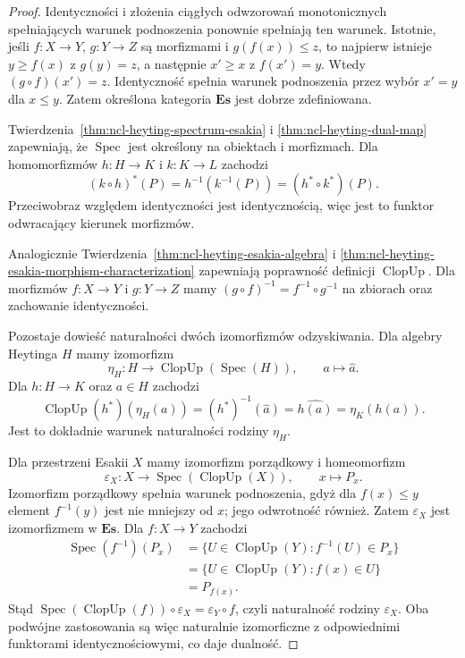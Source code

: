 \begin{proof}
Identyczności i złożenia ciągłych odwzorowań
monotonicznych spełniających warunek podnoszenia
ponownie spełniają ten warunek.
Istotnie, jeśli $f:X\to Y$, $g:Y\to Z$ są
morfizmami i $g(f(x))\leq z$, to najpierw
istnieje $y\geq f(x)$ z $g(y)=z$,
a następnie $x'\geq x$ z $f(x')=y$.
Wtedy $(g\circ f)(x')=z$.
Identyczność spełnia warunek podnoszenia
przez wybór $x'=y$ dla $x\leq y$.
Zatem określona kategoria $\mathbf{Es}$ jest
dobrze zdefiniowana.

Twierdzenia~\ref{thm:ncl-heyting-spectrum-esakia}
i \ref{thm:ncl-heyting-dual-map} zapewniają,
że $\operatorname{Spec}$ jest określony
na obiektach i morfizmach. Dla homomorfizmów
$h:H\to K$ i $k:K\to L$ zachodzi
\[
 (k\circ h)^*(P)=h^{-1}(k^{-1}(P))
                 =(h^*\circ k^*)(P).
\]
Przeciwobraz względem identyczności jest
identycznością, więc jest to funktor
odwracający kierunek morfizmów.

Analogicznie
Twierdzenia~\ref{thm:ncl-heyting-esakia-algebra}
i \ref{thm:ncl-heyting-esakia-morphism-characterization}
zapewniają poprawność definicji
$\operatorname{ClopUp}$. Dla morfizmów
$f:X\to Y$ i $g:Y\to Z$ mamy
$(g\circ f)^{-1}=f^{-1}\circ g^{-1}$
na zbiorach oraz zachowanie identyczności.

Pozostaje dowieść naturalności dwóch izomorfizmów
odzyskiwania. Dla algebry Heytinga $H$ mamy
izomorfizm
\[
 \eta_H:H\to\operatorname{ClopUp}(\operatorname{Spec}(H)),
 \qquad a\mapsto\widehat a.
\]
Dla $h:H\to K$ oraz $a\in H$ zachodzi
\[
 \operatorname{ClopUp}(h^*)(\eta_H(a))
   =(h^*)^{-1}(\widehat a)
   =\widehat{h(a)}
   =\eta_K(h(a)).
\]
Jest to dokładnie warunek naturalności rodziny
$\eta_H$.

Dla przestrzeni Esakii $X$ mamy izomorfizm
porządkowy i homeomorfizm
\[
 \varepsilon_X:X\to\operatorname{Spec}(\operatorname{ClopUp}(X)),
 \qquad x\mapsto P_x.
\]
Izomorfizm porządkowy spełnia warunek podnoszenia,
gdyż dla $f(x)\leq y$ element $f^{-1}(y)$
jest nie mniejszy od $x$; jego odwrotność
również. Zatem $\varepsilon_X$ jest
izomorfizmem w $\mathbf{Es}$.
Dla $f:X\to Y$ zachodzi
\[
\begin{aligned}
 \operatorname{Spec}(f^{-1})(P_x)
 &=\{U\in\operatorname{ClopUp}(Y):f^{-1}(U)\in P_x\}\\
 &=\{U\in\operatorname{ClopUp}(Y): f(x)\in U\}\\
 &=P_{f(x)}.
\end{aligned}
\]
Stąd $\operatorname{Spec}(\operatorname{ClopUp}(f))
\circ\varepsilon_X=\varepsilon_Y\circ f$,
czyli naturalność rodziny $\varepsilon_X$.
Oba podwójne zastosowania są więc naturalnie
izomorficzne z odpowiednimi funktorami
identycznościowymi, co daje dualność.
\end{proof}

